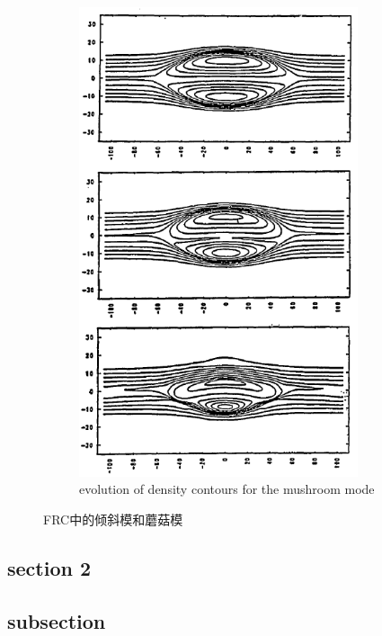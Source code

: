 \begin{figure}[!hbtp]
\begin{subfigure}[b]{0.45\textwidth}
    \includegraphics[width=0.9\textwidth]{figs/mushroom.png}
    \caption{evolution of density contours for the mushroom mode}
    \label{fig: mushroom}
    \end{subfigure}
    \caption{FRC中的倾斜模和蘑菇模\cite{staudenmeier1991fluid}}
    \label{fig: tilt and mushroom}
\end{figure}



\subsection{section 2}



\subsection{subsection}

